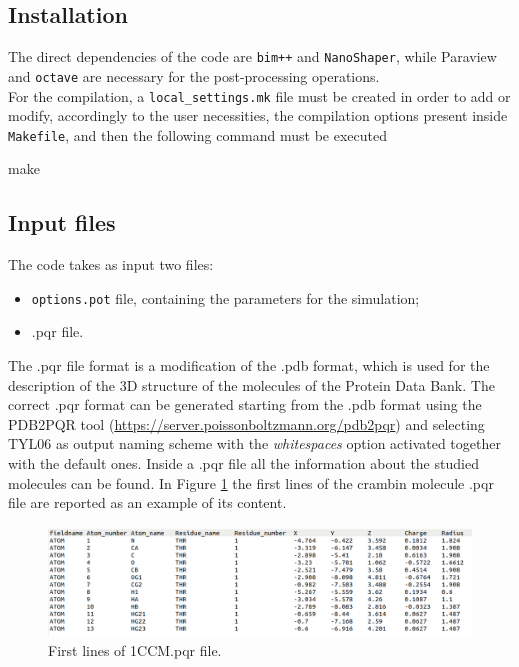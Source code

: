 \documentclass[11pt,a4paper]{article}
\begin{document}
\subsection{Installation}
The direct dependencies of the code are \texttt{bim++} and \texttt{NanoShaper}, while Paraview and \texttt{octave} are necessary for the post-processing operations. \\
For the compilation, a \texttt{local\_settings.mk} file must be created in order to add or modify, accordingly to the user necessities, the compilation options present inside \texttt{Makefile}, and then the following command must be executed 
\begin{code}
make
\end{code}

\subsection{Input files}
The code takes as input two files:
\begin{itemize}
    \item \texttt{options.pot} file, containing the parameters for the simulation;
    \item .pqr file.
\end{itemize}
\bigskip
The .pqr file format is a modification of the .pdb format, which is used for the description of the 3D structure of the molecules of the Protein Data Bank. The correct .pqr format can be generated starting from the .pdb format using the PDB2PQR tool (\url{https://server.poissonboltzmann.org/pdb2pqr}) and selecting TYL06 as output naming scheme with the \emph{whitespaces} option activated together with the default ones. Inside a .pqr file all the information about the studied molecules can be found. In Figure \ref{fig:pqr_example} the first lines of the crambin molecule .pqr file are reported as an example of its content. 

\begin{figure}[H]
    \centering
    \includegraphics[scale = 0.4]{Images/pqr.jpg}
    \caption{First lines of 1CCM.pqr file.}
    \label{fig:pqr_example}
\end{figure}
\end{document}
